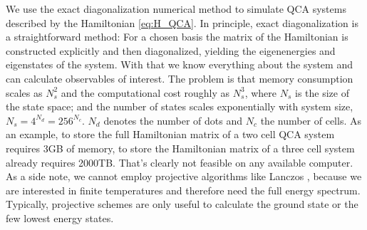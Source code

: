 We use the exact diagonalization numerical method \cite{Fehske} to simulate QCA
systems described by the Hamiltonian \eqref{eq:H_QCA}. In principle, exact
diagonalization is a straightforward method: For a chosen basis the matrix of
the Hamiltonian is constructed explicitly and then diagonalized, yielding the
eigenenergies and eigenstates of the system. With that we know everything about
the system and can calculate observables of interest. The problem is that memory
consumption scales as $N_s^2$ and the computational cost roughly as $N_s^3$,
where $N_s$ is the size of the state space; and the number of states scales
exponentially with system size, $N_s = 4^{N_d} = 256^{N_c}$. $N_d$ denotes the
number of dots and $N_c$ the number of cells. As an example, to store the full
Hamiltonian matrix of a two cell QCA system requires 3GB of memory, to store the
Hamiltonian matrix of a three cell system already requires 2000TB. That's
clearly not feasible on any available computer. As a side note, we cannot employ
projective algorithms like Lanczos \cite{Fehske}, because we are interested in
finite temperatures and therefore need the full energy spectrum. Typically,
projective schemes are only useful to calculate the ground state or the few
lowest energy states. 

